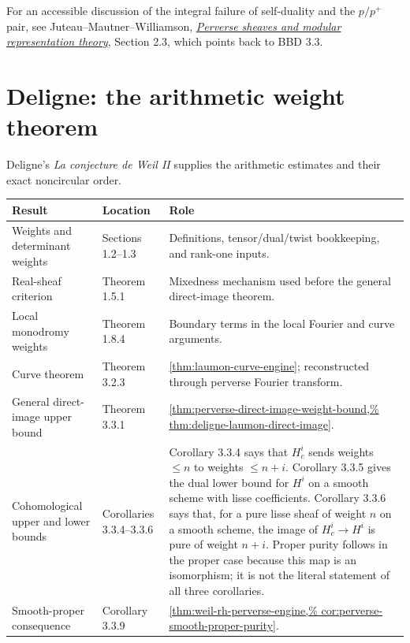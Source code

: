For an accessible discussion of the integral failure of self-duality and
the \(p/p^+\) pair, see Juteau--Mautner--Williamson,
\href{https://arxiv.org/abs/0901.3322}
{\emph{Perverse sheaves and modular representation theory}}, Section 2.3,
which points back to BBD 3.3.

\section{Deligne: the arithmetic weight theorem}

Deligne's \emph{La conjecture de Weil II} \cite{DeligneWeilII} supplies the
arithmetic estimates and their exact noncircular order.

\begin{longtable}{
 >{\raggedright\arraybackslash}p{}
 >{\raggedright\arraybackslash}p{}
 >{\raggedright\arraybackslash}p{}}
\toprule
Result & Location & Role\\
\midrule
\endhead
Weights and determinant weights &
Sections 1.2--1.3 &
Definitions, tensor/dual/twist bookkeeping, and rank-one inputs.\\

Real-sheaf criterion &
Theorem 1.5.1 &
Mixedness mechanism used before the general direct-image theorem.\\

Local monodromy weights &
Theorem 1.8.4 &
Boundary terms in the local Fourier and curve arguments.\\

Curve theorem &
Theorem 3.2.3 &
\cref{thm:laumon-curve-engine}; reconstructed through perverse Fourier
transform.\\

General direct-image upper bound &
Theorem 3.3.1 &
\cref{thm:perverse-direct-image-weight-bound,%
thm:deligne-laumon-direct-image}.\\

Cohomological upper and lower bounds &
Corollaries 3.3.4--3.3.6 &
Corollary 3.3.4 says that \(H_c^i\) sends weights \(\leq n\) to weights
\(\leq n+i\).  Corollary 3.3.5 gives the dual lower bound for \(H^i\) on a
smooth scheme with lisse coefficients.  Corollary 3.3.6 says that, for a
pure lisse sheaf of weight \(n\) on a smooth scheme, the image of
\(H_c^i\to H^i\) is pure of weight \(n+i\).  Proper purity follows in the
proper case because this map is an isomorphism; it is not the literal
statement of all three corollaries.\\

Smooth-proper consequence &
Corollary 3.3.9 &
\cref{thm:weil-rh-perverse-engine,%
cor:perverse-smooth-proper-purity}.\\
\bottomrule
\end{longtable}

